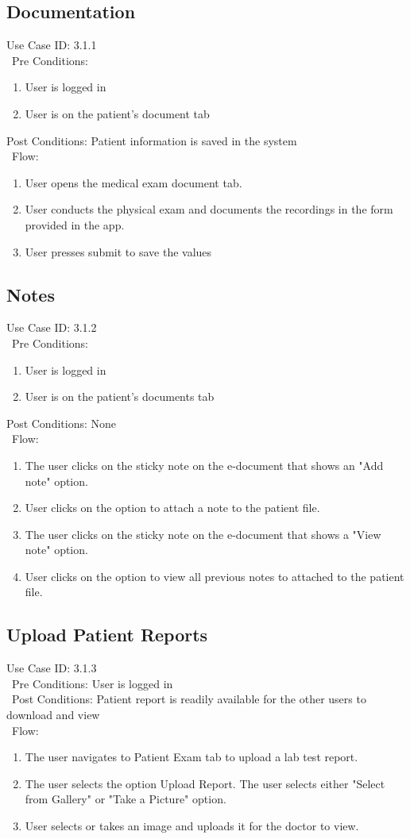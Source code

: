 \subsection{Documentation} 
Use Case ID: 3.1.1\\\
Pre Conditions:
\begin{enumerate}
    \item User is logged in
    \item User is on the patient's document tab
\end{enumerate}
Post Conditions: Patient information is saved in the system\\\
Flow: 
\begin{enumerate}
    \item User opens the medical exam document tab. 
    \item User conducts the physical exam and documents the recordings in the form provided in the app.
    \item User presses submit to save the values
\end{enumerate}
\subsection{Notes} 
Use Case ID: 3.1.2\\\
Pre Conditions:
\begin{enumerate}
    \item User is logged in
    \item User is on the patient's documents tab
\end{enumerate}
Post Conditions: None\\\
Flow:
\begin{enumerate}
    \item The user clicks on the sticky note on the e-document that shows an "Add note" option. 
    \item User clicks on the option to attach a note to the patient file. 
    \item The user clicks on the sticky note on the e-document that shows a "View note" option. 
    \item User clicks on the option to view all previous notes to attached to the patient file.
\end{enumerate}
\subsection{Upload Patient Reports} 
Use Case ID: 3.1.3\\\
Pre Conditions: User is logged in\\\
Post Conditions: Patient report is readily available for the other users to download and view\\\
Flow: 
\begin{enumerate}
    \item The user navigates to Patient Exam tab to upload a lab test report. 
    \item The user selects the option Upload Report. The user selects either "Select from Gallery" or "Take a Picture" option. 
    \item User selects or takes an image and uploads it for the doctor to view.
\end{enumerate}
